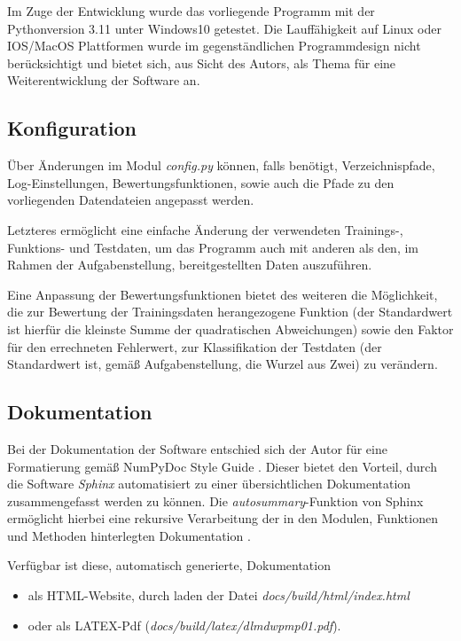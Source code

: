 Im Zuge der Entwicklung wurde das vorliegende Programm mit der Pythonversion 3.11 unter Windows10 getestet. Die Lauffähigkeit auf Linux oder IOS/MacOS Plattformen wurde im gegenständlichen Programmdesign nicht berücksichtigt und bietet sich, aus Sicht des Autors, als Thema für eine Weiterentwicklung der Software an.

\subsection{Konfiguration}

Über Änderungen im Modul \emph{config.py} können, falls benötigt, Verzeichnispfade, Log-Einstellungen, Bewertungsfunktionen, sowie auch die Pfade zu den vorliegenden Datendateien angepasst werden.

Letzteres ermöglicht eine einfache Änderung der verwendeten Trainings-, Funktions- und Testdaten, um das Programm auch mit anderen als den, im Rahmen der Aufgabenstellung, bereitgestellten Daten auszuführen.

Eine Anpassung der Bewertungsfunktionen bietet des weiteren die Möglichkeit, die zur Bewertung der Trainingsdaten herangezogene Funktion (der Standardwert ist hierfür die kleinste Summe der quadratischen Abweichungen) sowie den Faktor für den errechneten Fehlerwert, zur Klassifikation der Testdaten (der Standardwert ist, gemäß Aufgabenstellung, die Wurzel aus Zwei) zu verändern.

\subsection{Dokumentation}

Bei der Dokumentation der Software entschied sich der Autor für eine Formatierung gemäß NumPyDoc Style Guide \citep{numpydoc_v160_style_nodate}. Dieser bietet den Vorteil, durch die Software \emph{Sphinx} automatisiert zu einer übersichtlichen Dokumentation zusammengefasst werden zu können. Die \emph{autosummary}-Funktion von Sphinx ermöglicht hierbei eine rekursive Verarbeitung der in den Modulen, Funktionen und Methoden hinterlegten Dokumentation \citep{leedham_answer_2020}.

Verfügbar ist diese, automatisch generierte, Dokumentation
\begin{itemize}
 \itemsep0pt
 \item als HTML-Website, durch laden der Datei \emph{docs/build/html/index.html}
 \item oder als LATEX-Pdf (\emph{docs/build/latex/dlmdwpmp01.pdf}).
\end{itemize}


